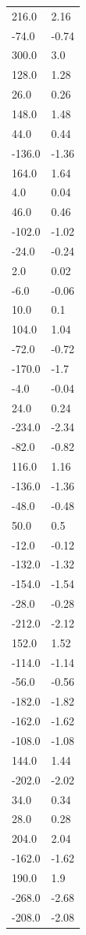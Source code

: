 \begin{longtable}{ll}
216.0 & 2.16 \\
-74.0 & -0.74 \\
300.0 & 3.0 \\
128.0 & 1.28 \\
26.0 & 0.26 \\
148.0 & 1.48 \\
44.0 & 0.44 \\
-136.0 & -1.36 \\
164.0 & 1.64 \\
4.0 & 0.04 \\
46.0 & 0.46 \\
-102.0 & -1.02 \\
-24.0 & -0.24 \\
2.0 & 0.02 \\
-6.0 & -0.06 \\
10.0 & 0.1 \\
104.0 & 1.04 \\
-72.0 & -0.72 \\
-170.0 & -1.7 \\
-4.0 & -0.04 \\
24.0 & 0.24 \\
-234.0 & -2.34 \\
-82.0 & -0.82 \\
116.0 & 1.16 \\
-136.0 & -1.36 \\
-48.0 & -0.48 \\
50.0 & 0.5 \\
-12.0 & -0.12 \\
-132.0 & -1.32 \\
-154.0 & -1.54 \\
-28.0 & -0.28 \\
-212.0 & -2.12 \\
152.0 & 1.52 \\
-114.0 & -1.14 \\
-56.0 & -0.56 \\
-182.0 & -1.82 \\
-162.0 & -1.62 \\
-108.0 & -1.08 \\
144.0 & 1.44 \\
-202.0 & -2.02 \\
34.0 & 0.34 \\
28.0 & 0.28 \\
204.0 & 2.04 \\
-162.0 & -1.62 \\
190.0 & 1.9 \\
-268.0 & -2.68 \\
-208.0 & -2.08 \\

\end{longtable}
